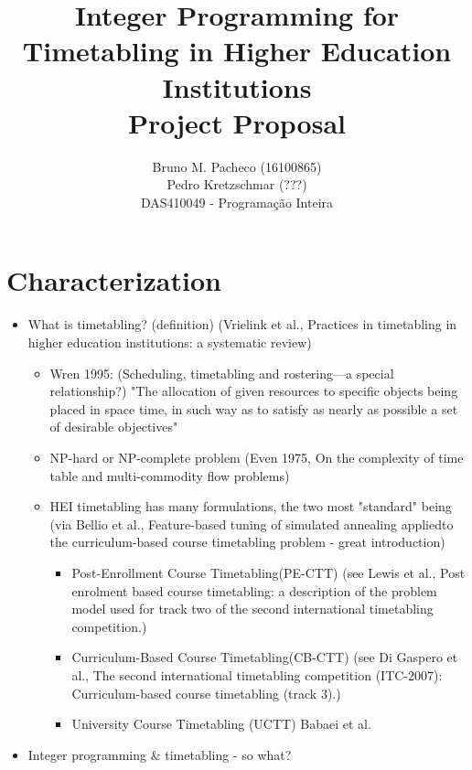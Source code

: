 \documentclass[a4paper]{report}
\begin{document}
 
\title{Integer Programming for Timetabling in Higher Education Institutions\\Project Proposal}
\author{Bruno M. Pacheco (16100865)\\
Pedro Kretzschmar (???) \\
DAS410049 - Programação Inteira}
 
\maketitle

\section*{Characterization}

\begin{itemize}
    \item What is timetabling? (definition) (Vrielink et al., Practices in timetabling in higher education institutions: a systematic review)
	\begin{itemize}
	    \item Wren 1995: (Scheduling, timetabling and rostering—a special relationship?) "The allocation of given resources to specific objects being placed in space time, in such way as to satisfy as nearly as possible a set of desirable objectives"
	    \item NP-hard or NP-complete problem (Even 1975, On the complexity of time table and multi-commodity flow problems)
	    \item HEI timetabling has many formulations, the two most "standard" being (via Bellio et al., Feature-based tuning of simulated annealing appliedto the curriculum-based course timetabling problem - great introduction)
		\begin{itemize}
		    \item Post-Enrollment Course Timetabling(PE-CTT) (see Lewis et al., Post enrolment based course timetabling: a description of the problem model used for track two of the second international timetabling competition.)
		    \item Curriculum-Based Course Timetabling(CB-CTT) (see Di Gaspero et al., The second international timetabling competition (ITC-2007): Curriculum-based course timetabling (track 3).)
		    \item University Course Timetabling (UCTT) Babaei et al.
		\end{itemize}
	\end{itemize}
    \item Integer programming \& timetabling - so what?

\end{itemize}
\end{document}
